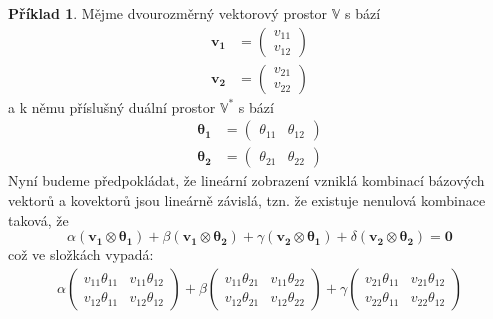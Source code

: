 \documentclass[a5paper,12pt]{amsbook}
\theoremstyle{definition}
\newtheorem{example}{Příklad}[chapter]
\newcommand{\myvec}[1]{\mathbf{#1}}
\newcommand{\myspace}[1]{\mathbb{#1}}
\newcommand{\mydual}[1]{\myspace{#1^{*}}}
\begin{document}
\begin{example}
Mějme dvourozměrný vektorový prostor $\myspace{V}$ s bází
\begin{equation*}
\begin{split}
\myvec{v_1} &= \left(\begin{array}{c}v_{11} \\ v_{12}\end{array}\right) \\
\myvec{v_2} &= \left(\begin{array}{c}v_{21} \\ v_{22}\end{array}\right)
\end{split}
\end{equation*}
a k němu příslušný duální prostor $\mydual{V}$ s bází
\begin{equation*}
\begin{split}
\myvec{\theta_1} &= \left(\begin{array}{cc}\theta_{11} & \theta_{12}\end{array}\right) \\
\myvec{\theta_2} &= \left(\begin{array}{cc}\theta_{21} & \theta_{22}\end{array}\right)
\end{split}
\end{equation*}
Nyní budeme předpokládat, že lineární zobrazení vzniklá kombinací bázových vektorů a kovektorů
jsou lineárně závislá, tzn. že existuje nenulová kombinace taková, že
\begin{equation*}
\alpha (\myvec{v_1}\otimes\myvec{\theta_1}) + \beta (\myvec{v_1}\otimes\myvec{\theta_2}) 
  + \gamma (\myvec{v_2}\otimes\myvec{\theta_1}) + \delta (\myvec{v_2}\otimes\myvec{\theta_2}) = \myvec{0}
\end{equation*}
což ve složkách vypadá:
\begin{equation*}
\begin{split}
\alpha\left(\begin{array}{cc}v_{11}\theta_{11} & v_{11}\theta_{12} \\ v_{12}\theta_{11} & v_{12}\theta_{12}\end{array}\right)
+ \beta\left(\begin{array}{cc}v_{11}\theta_{21} & v_{11}\theta_{22} \\ v_{12}\theta_{21} & v_{12}\theta_{22}\end{array}\right)
+ \gamma\left(\begin{array}{cc}v_{21}\theta_{11} & v_{21}\theta_{12} \\ v_{22}\theta_{11} & v_{22}\theta_{12}\end{array}\right) \\

\end{split}
\end{equation*}
\end{example}
\end{document}
